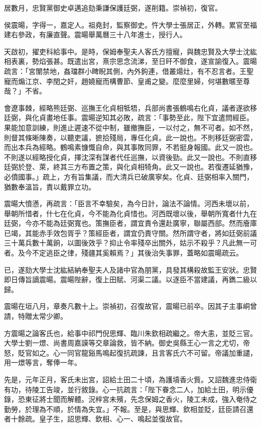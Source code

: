 \begin{pinyinscope}
居數月，忠賢黨御史卓邁追劾秉謙保護廷弼，遂削籍。崇禎初，復官。

侯震暘，字得一，嘉定人。祖堯封，監察御史。忤大學士張居正，外轉。累官至福建右參政，有廉直聲。震暘舉萬曆三十八年進士，授行人。

天啟初，擢吏科給事中。是時，保姆奉聖夫人客氏方擅寵，與魏忠賢及大學士沈紘相表裏，勢焰張甚。既遣出宮，熹宗思念流涕，至日旰不御食，遂宣諭復入。震暘疏言：「宮闈禁地，姦璫群小睥睨其側，內外鉤連，借叢煬灶，有不忍言者。王聖寵而煽江京、李閏之奸，趙嬈寵而構曹節、皇甫之變。麼麼里婦，何堪數暱至尊哉？」不省。

會遼事棘，經略熊廷弼、巡撫王化貞相牴牾，兵部尚書張鶴鳴右化貞，議者遂欲移廷弼，與化貞畫地任事。震暘逆知其必敗，疏言：「事勢至此，陛下宜遣問經臣。果能加意訓練，則進止遲速不從中制，雖撤撫臣，一以付之，無不可者。如不然，則督其條晰陳奏，以聽吏議，摭拾殘局，專任化貞。此一說也。不則移廷弼密雲，而出本兵為經略。鶴鳴素慷慨自命，與其事敗同罪，不若挺身報國。此又一說也。不則遂以經略授化貞，擇沈深有謀者代任巡撫，以資後勁。此又一說也。不則直移廷弼於登、萊，終其三方布置之策，與化貞相犄角。此又一說也。若復遷延猶豫，必僨國事。」疏上，方有旨集議，而大清兵已破廣寧矣。化貞、廷弼相率入關門，猶數奉溫旨，責以戴罪立功。

震暘大憤懣，再疏言：「臣言不幸驗矣，為今日計，論法不論情。河西未壞以前，舉朝所惜者，什七在化貞，今不能為化貞惜也。河西既壞以後，舉朝所寬者什九在廷弼，今亦不能為廷弼寬也。策撫臣者，謂宜責令還赴廣寧，聯屬西部。然而廥庫已竭，其能赤手效包胥乎？策經臣者，謂宜仍責守關。然所謂守者，將如廷弼前議三十萬兵數十萬餉，以圖後效乎？抑止令率殘卒出關外，姑示不殺乎？凡此無一可者。及今不定逃臣之律，殘疆其奚賴焉？」其後治失事罪，蓋略如震暘疏云。

已，遂劾大學士沈紘結納奉聖夫人及諸中官為朋黨，具發其構殺故監王安狀。忠賢即日傳旨謫震暘。震暘陛辭，復上田賦、河渠二議。以逐臣不當建議，再鐫二級以歸。

震暘在垣八月，章奏凡數十上。崇禎初，召復故官，震暘已前卒。因其子主事峒曾請，特贈太常少卿。

方震暘之論客氏也，給事中祁門倪思輝、臨川朱欽相疏繼之。帝大恚，並貶三官。大學士劉一燝、尚書周嘉謨等交章論救，皆不納。御史吳縣王心一言之尤切，帝怒，貶官如之。心一同官龍谿馬鳴起復抗疏諫，且言客氏六不可留。帝議加重譴，用一燝等言，奪俸一年。

先是，元年正月，客氏未出宮，詔給土田二十頃，為護墳香火貲。又詔魏進忠侍衛有功，待陵工告竣，並行敘錄。心一抗疏言：「陛下眷念二人，加給土田，明示優錄，恐東征將士聞而解體。況梓宮未殯，先念保姆之香火，陵工未成，強入奄侍之勤勞，於理為不順，於情為失宜。」不報。至是，與思輝、欽相並貶，廷臣請召還者十餘疏。皇子生，詔思輝、欽相、心一、鳴起並復故官。


\end{pinyinscope}
